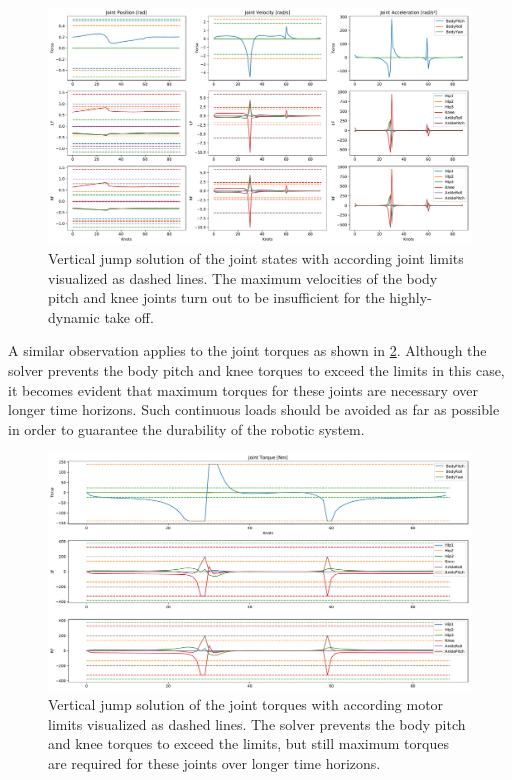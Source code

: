 \begin{figure}[h!]
\centering	
\includegraphics[width=1\textwidth]{fig/jumpVertical/JointState}
\caption[Vertical jump solution according joint limits]{Vertical jump solution of the joint states with according joint limits visualized as dashed lines. The maximum velocities of the body pitch and knee joints turn out to be insufficient for the highly-dynamic take off.}
\label{fig:jumpVertical_JointState}
\end{figure} 

A similar observation applies to the joint torques as shown in \cref{fig:jumpVertical_JointTorques}. Although the solver prevents the body pitch and knee torques to exceed the limits in this case, it becomes evident that maximum torques for these joints are necessary over longer time horizons. Such continuous loads should be avoided as far as possible in order to guarantee the durability of the robotic system.

\begin{figure}[h!]
\centering	
\includegraphics[width=1\textwidth]{fig/jumpVertical/JointTorques}
\caption[Vertical jump solution with according torque limits]{Vertical jump solution of the joint torques with according motor limits visualized as dashed lines. The solver prevents the body pitch and knee torques to exceed the limits, but still maximum torques are required for these joints over longer time horizons.}
\label{fig:jumpVertical_JointTorques}
\end{figure} 

